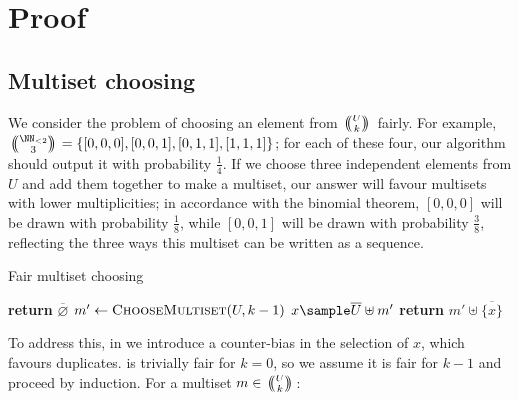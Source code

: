 \documentclass[letterpaper,luatex,11pt]{article}
\newcommand{\multichoose}[2]{
\left.\mathchoice
  {\left(\kern-0.48em\binom{#1}{#2}\kern-0.48em\right)}
  {\big(\kern-0.30em\binom{\smash{#1}}{\smash{#2}}\kern-0.30em\big)}
  {\left(\kern-0.30em\binom{\smash{#1}}{\smash{#2}}\kern-0.30em\right)}
  {\left(\kern-0.30em\binom{\smash{#1}}{\smash{#2}}\kern-0.30em\right)}
\right.}
\begin{document}
\section{Proof}

\subsection{Multiset choosing}

We consider the problem of choosing an element from $\multichoose{U}{k}$ fairly.
For example, $\multichoose{\NN_{<2}}{3} = \{[0, 0, 0], [0, 0, 1], [0, 1, 1], [1, 1, 1]\}$; 
for each of these four, our algorithm should output it with probability $\frac{1}{4}$.
If we choose three independent elements from $U$ and add them together to make a multiset,
our answer will favour multisets with lower multiplicities; in accordance
with the binomial theorem, $[0, 0, 0]$ will be drawn with probability $\frac{1}{8}$, while
$[0, 0, 1]$ will be drawn with probability $\frac{3}{8}$, reflecting the three ways this multiset
can be written as a sequence.



\begin{algorithm}
\caption{Fair multiset choosing}
\begin{algorithmic}[0]
        \State \textbf{return} $\overline{\varnothing}$
    \Else
        \State $m' \leftarrow \textproc{ChooseMultiset}(U, k-1)$
        \State $x \sample \overline{U} \uplus m'$
        \State \textbf{return} $m' \uplus \overline{\{x\}}$
    \EndIf
\EndProcedure
\end{algorithmic}
\end{algorithm}

To address this, in 
we introduce a counter-bias in the selection of $x$, which favours duplicates.
 is trivially fair for $k = 0$, so
we assume it is fair for $k - 1$ and proceed by induction.
For a multiset $m \in \multichoose{U}{k}$:
\end{document}
